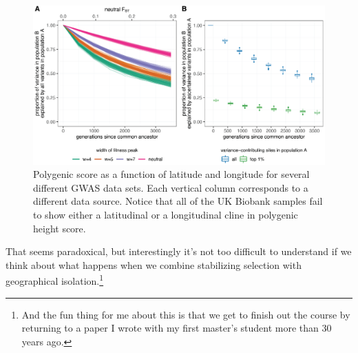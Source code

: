 \documentclass[12pt]{article}
\begin{document}
\begin{figure}
  \begin{center}
    \includegraphics[width=\textwidth]{yair-coop-predictions.eps}
  \end{center}
  \caption{Polygenic score as a function of latitude and longitude for
    several different GWAS data sets. Each vertical column corresponds
  to a different data source. Notice that all of the UK Biobank
  samples fail to show either a latitudinal or a longitudinal cline in
  polygenic height score.}\label{fig:UK-biobank} 
\end{figure}

That seems paradoxical, but interestingly it's not too difficult to
understand if we think about what happens when we combine stabilizing
selection with geographical isolation.\footnote{And the fun thing for
  me about this is that we get to finish out the course by returning
  to a paper I wrote with my first master's student more than 30 years
  ago.} 




\ccLicense
\end{document}
